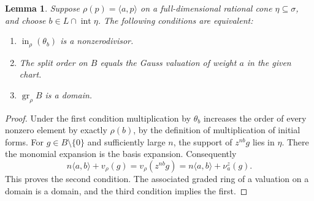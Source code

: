 \documentclass[11pt,reqno]{amsart}
\numberwithin{equation}{section}
\newtheorem{lemma}[theorem]{Lemma}
\theoremstyle{definition}
\theoremstyle{remark}
\begin{document}
\begin{lemma}\label{lem:probe-graded-test}
Suppose \(\rho(p)=\langle a,p\rangle\) on a full-dimensional rational
cone \(\eta\subseteq\sigma\), and choose \(b\in L\cap\operatorname{int}\eta\).
The following conditions are equivalent:
\begin{enumerate}
\item \(\operatorname{in}_\rho(\theta_b)\) is a nonzerodivisor.
\item The split order on \(B\) equals the Gauss valuation of weight \(a\)
      in the given chart.
\item \(\operatorname{gr}_\rho B\) is a domain.
\end{enumerate}
\end{lemma}
\begin{proof}
Under the first condition multiplication by \(\theta_b\) increases
the order of every nonzero element by exactly \(\rho(b)\), by the
definition of multiplication of initial forms. For \(g\in B\setminus
\{0\}\) and sufficiently large \(n\), the support of \(z^{nb}g\)
lies in \(\eta\). There the monomial expansion is the basis expansion.
Consequently
\[ n\langle a,b\rangle+v_\rho(g) =v_\rho(z^{nb}g)=n\langle a,b\rangle+\nu^z_a(g). \]
This proves the second condition. The associated graded ring of a
valuation on a domain is a domain, and the third condition implies
the first.
\end{proof}
\end{document}
